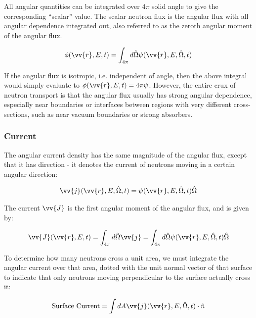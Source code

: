 \documentclass[10pt]{article}
\begin{document}
\begin{flushleft}
All angular quantities can be integrated over \(4\pi\) solid angle to give the corresponding ``scalar'' value. The scalar neutron flux is the angular flux with all angular dependence integrated out, also referred to as the zeroth angular moment of the angular flux.

\begin{equation}
\label{eq:ScalarFlux}
\phi(\vv{r}, E, t) = \int_{4\pi}^{} d\hat{\Omega} \psi(\vv{r}, E, \hat{\Omega}, t)
\end{equation}

If the angular flux is isotropic, i.e. independent of angle, then the above integral would simply evaluate to \(\phi(\vv{r}, E, t)=4\pi\psi\). However, the entire crux of neutron transport is that the angular flux usually has strong angular dependence, especially near boundaries or interfaces between regions with very different cross-sections, such as near vacuum boundaries or strong absorbers. 

\subsubsection{Current}

The angular current density has the same magnitude of the angular flux, except that it has direction - it denotes the current of neutrons moving in a certain angular direction:

\begin{equation}
\label{eq:AngularCurrent}
\vv{j}(\vv{r}, E, \hat{\Omega}, t) = \psi(\vv{r}, E, \hat{\Omega}, t)\hat{\Omega}
\end{equation}

The current \(\vv{J}\) is the first angular moment of the angular flux, and is given by:

\begin{equation}
\label{eq:Current}
\vv{J}(\vv{r},E,t)=\int_{4\pi}^{}d\hat{\Omega}\vv{j}=\int_{4\pi}^{}d\hat{\Omega}\psi(\vv{r},E,\hat{\Omega},t)\hat{\Omega}
\end{equation}

To determine how many neutrons cross a unit area, we must integrate the angular current over that area, dotted with the unit normal vector of that surface to indicate that only neutrons moving perpendicular to the surface actually cross it:

\begin{equation}
\label{eq:AngularCurrent}
\textrm{Surface Current} = \int dA \vv{j}(\vv{r}, E, \hat{\Omega}, t)\cdot\hat{n}
\end{equation}


\end{flushleft}
\end{document}
